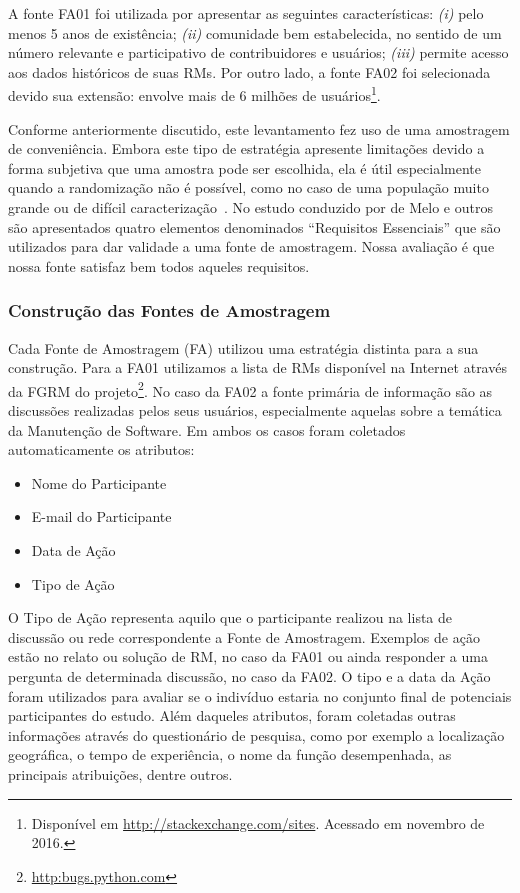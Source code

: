 A fonte FA01 foi utilizada por apresentar as seguintes características:
\textit{(i)} pelo menos 5 anos de existência; \textit{(ii)} comunidade bem
estabelecida, no sentido de um número relevante e participativo de
contribuidores e usuários; \textit{(iii)} permite acesso aos dados históricos de
suas RMs. Por outro lado, a fonte FA02 foi selecionada devido sua extensão:
envolve mais de 6 milhões de usuários\footnote{Disponível em
    \url{http://stackexchange.com/sites}. Acessado em novembro de 2016.}.

Conforme anteriormente discutido, este levantamento fez uso de uma amostragem
de conveniência. Embora este tipo de estratégia apresente limitações devido a
forma subjetiva que uma amostra pode ser escolhida, ela é útil especialmente
quando a randomização não é possível, como no caso de uma população muito
grande ou de difícil caracterização~\cite{boxill1997introduction}. No estudo
conduzido por de Melo e outros~\cite{de2014towards} são apresentados quatro
elementos denominados ``Requisitos Essenciais'' que são utilizados para dar
validade a uma fonte de amostragem. Nossa avaliação é que nossa fonte satisfaz
bem todos aqueles
requisitos.

\subsubsection{Construção das Fontes de Amostragem}
\label{subsubsec:construcao_fonte_amostragem}

Cada Fonte de Amostragem (FA) utilizou uma estratégia distinta para a sua
construção. Para a FA01 utilizamos a lista de RMs disponível na Internet através
da FGRM do projeto\footnote{\url{http:bugs.python.com}}. No caso da FA02 a fonte
primária de informação são as discussões realizadas pelos seus usuários,
especialmente aquelas sobre a temática da Manutenção de Software. Em ambos os
casos foram coletados automaticamente os atributos:

\begin{itemize}
	\item Nome do Participante
	\item E-mail do Participante
	\item Data de Ação
	\item Tipo de Ação
\end{itemize}

O Tipo de Ação representa aquilo que o participante realizou na lista de
discussão ou rede correspondente a Fonte de Amostragem. Exemplos de ação estão no
relato ou solução de RM, no caso da FA01 ou ainda responder a uma pergunta de
determinada discussão, no caso da FA02. O tipo e a data da Ação foram utilizados
para avaliar se o indivíduo estaria no conjunto final de potenciais
participantes do estudo. Além daqueles atributos, foram coletadas outras
informações através do questionário de pesquisa, como por exemplo a localização
geográfica, o tempo de experiência, o nome da função desempenhada, as principais
atribuições, dentre outros.

